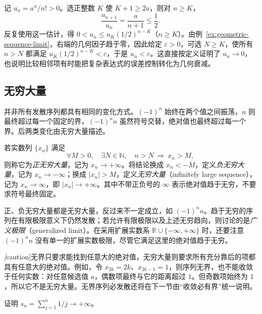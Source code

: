 \begin{solve}
记 $u_n=a^n/n!>0$。选正整数 $K$ 使 $K+1\geq2a$，则对 $n\geq K$，
\[
    \frac{u_{n+1}}{u_n}=\frac{a}{n+1}\leq\frac12.
\]
反复使用这一估计，得 $0<u_n\leq u_K(1/2)^{n-K}$（$n\geq K$）。由例~\ref{ex:geometric-sequence-limit}，右端的几何因子趋于零，因此给定 $\varepsilon>0$，可选 $N\geq K$，使所有 $n>N$ 都满足 $u_K(1/2)^{n-K}<\varepsilon$，于是 $u_n<\varepsilon$。这直接按定义证明了 $u_n\to0$，也说明比较相邻项有时能把复杂表达式的误差控制转化为几何衰减。
\end{solve}

\subsection{无穷大量}
\label{subsec:infinite-sequences}

并非所有发散序列都具有相同的变化方式。$(-1)^n$ 始终在两个值之间振荡，$n$ 则最终超过每一个固定的界，$(-1)^n n$ 虽然符号交替，绝对值也最终超过每一个界。后两类变化由无穷大量描述。

\begin{definition}
\label{def:infinite-sequence}
若实数列 $\{x_n\}$ 满足
\begin{equation}
    \forall M>0,\quad\exists N\in\mathbb{N},\quad
    n>N\ \Longrightarrow\ x_n>M,
    \label{eq:positive-infinite-sequence}
\end{equation}
则称它为\emph{正无穷大量}，记为 $x_n\to+\infty$。将结论换成 $x_n<-M$，定义\emph{负无穷大量}，记为 $x_n\to-\infty$；换成 $|x_n|>M$，定义\emph{无穷大量}（infinitely large sequence），记为 $x_n\to\infty$，即 $|x_n|\to+\infty$。其中不带正负号的 $\infty$ 表示绝对值趋于无穷，不要求符号最终固定。
\end{definition}

正、负无穷大量都是无穷大量，反过来不一定成立，如 $(-1)^n n$。趋于无穷的序列在有限极限意义下仍然发散；若允许有限极限以及上述无穷趋向，则讨论的是\emph{广义极限}（generalized limit）。在采用扩展实数系 $\mathbb{R}\cup\{-\infty,+\infty\}$ 时，还要注意 $(-1)^n n$ 没有单一的扩展实数极限，尽管它满足这里的绝对值趋于无穷。

\emph[caution]{无界只要求能找到任意大的绝对值，无穷大量则要求所有充分靠后的项都具有任意大的绝对值。}例如，令 $x_{2k}=2k$、$x_{2k-1}=1$，则序列无界，也不能收敛于任何实数：对任意候选值 $a$，偶数项最终与它的距离超过 $1$。但奇数项始终为 $1$，所以它不是无穷大量。无界序列必发散还将在下一节由“收敛必有界”统一说明。

\begin{example}
\label{ex:harmonic-sequence-positive-infinity}
证明 $s_n=\sum_{j=1}^n1/j\to+\infty$。
\end{example}

